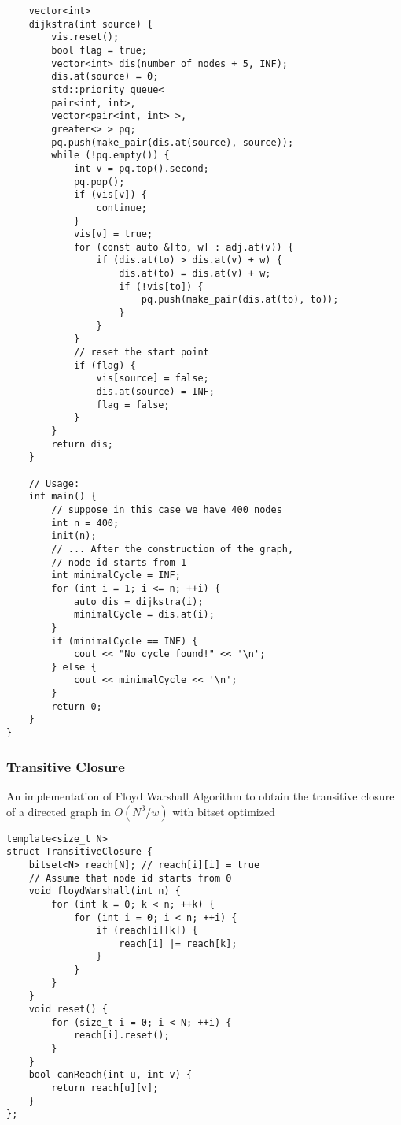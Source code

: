 \documentclass[10pt]{article}{\twocolumn}
\begin{document}
\begin{lstlisting}
    vector<int>
    dijkstra(int source) {
        vis.reset();
        bool flag = true;
        vector<int> dis(number_of_nodes + 5, INF);
        dis.at(source) = 0;
        std::priority_queue<
        pair<int, int>, 
        vector<pair<int, int> >, 
        greater<> > pq;
        pq.push(make_pair(dis.at(source), source));
        while (!pq.empty()) {
            int v = pq.top().second;
            pq.pop();
            if (vis[v]) {
                continue;
            }
            vis[v] = true;
            for (const auto &[to, w] : adj.at(v)) {
                if (dis.at(to) > dis.at(v) + w) {
                    dis.at(to) = dis.at(v) + w;
                    if (!vis[to]) {
                        pq.push(make_pair(dis.at(to), to));
                    }
                }
            }
            // reset the start point
            if (flag) {
                vis[source] = false;
                dis.at(source) = INF;
                flag = false;
            }
        }
        return dis;
    }

    // Usage:
    int main() {
        // suppose in this case we have 400 nodes
        int n = 400;
        init(n);
        // ... After the construction of the graph, 
        // node id starts from 1
        int minimalCycle = INF;
        for (int i = 1; i <= n; ++i) {
            auto dis = dijkstra(i);
            minimalCycle = dis.at(i);
        }
        if (minimalCycle == INF) {
            cout << "No cycle found!" << '\n';
        } else {
            cout << minimalCycle << '\n';
        }
        return 0;
    }
}

\end{lstlisting}

\subsubsection{Transitive Closure}
An implementation of Floyd Warshall Algorithm to obtain
the transitive closure of a directed graph in $O(N^3 / w)$
with bitset optimized
\begin{lstlisting}
template<size_t N>
struct TransitiveClosure {
    bitset<N> reach[N]; // reach[i][i] = true
    // Assume that node id starts from 0
    void floydWarshall(int n) {
        for (int k = 0; k < n; ++k) {
            for (int i = 0; i < n; ++i) {
                if (reach[i][k]) {
                    reach[i] |= reach[k];
                }
            }
        }
    }
    void reset() {
        for (size_t i = 0; i < N; ++i) {
            reach[i].reset();
        }
    }
    bool canReach(int u, int v) {
        return reach[u][v];
    }
};
\end{lstlisting}
\end{document}
